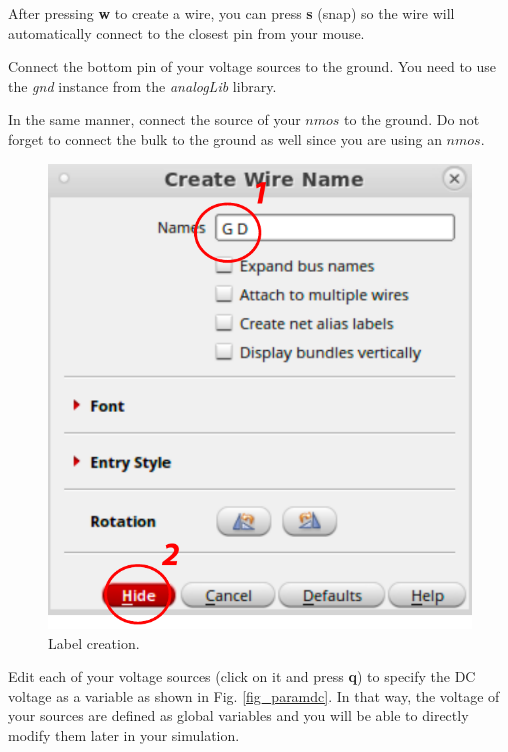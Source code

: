 \begin{enumerate}
	\begin{remark}
		After pressing \textbf{w} to create a wire, you can press \textbf{s} (snap) so the wire will automatically connect to the closest pin from your mouse.
	\end{remark}
	
	\item Connect the bottom pin of your voltage sources to the ground. You need to use the \textit{gnd} instance from the \textit{analogLib} library.
	\item In the same manner, connect the source of your $nmos$ to the ground. Do not forget to connect the bulk to the ground as well since you are using an $nmos$.
	
	
	
	\parbox[t]{\dimexpr\textwidth-\leftmargin}{%
		\begin{figure}
			\vspace{-0mm}
			\centering
			\vspace{-\baselineskip}
			\includegraphics[scale=0.4]{figures/lab1_schematic_sim/label.pdf}
			\caption{Label creation.}
			\label{fig_label}
		\end{figure}
		\item Edit each of your voltage sources (click on it and press \textbf{q}) to specify the DC voltage as a variable as shown in Fig. \ref{fig_paramdc}. In that way, the voltage of your sources are defined as global variables and you will be able to directly modify them later in your simulation. 
}
\end{enumerate}
